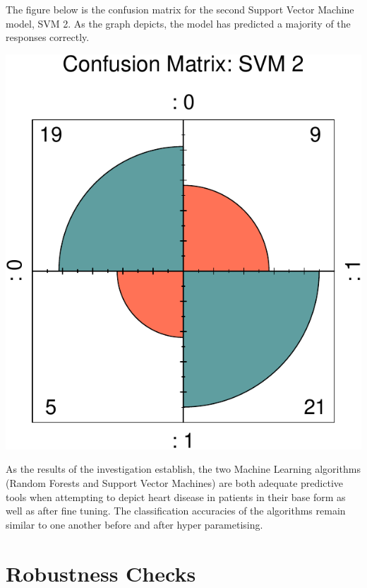 \documentclass[11pt,preprint, authoryear]{elsarticle}
\numberwithin{equation}{section}
\numberwithin{figure}{section}
\numberwithin{table}{section}
\begin{document}
\newpage

The figure below is the confusion matrix for the second Support Vector
Machine model, SVM 2. As the graph depicts, the model has predicted a
majority of the responses correctly.

\includegraphics{ML_project_files/figure-latex/unnamed-chunk-22-1.pdf}

As the results of the investigation establish, the two Machine Learning
algorithms (Random Forests and Support Vector Machines) are both
adequate predictive tools when attempting to depict heart disease in
patients in their base form as well as after fine tuning. The
classification accuracies of the algorithms remain similar to one
another before and after hyper parametising.

\newpage

\hypertarget{robustness-checks}{%
\section{Robustness Checks}\label{robustness-checks}}
\end{document}
